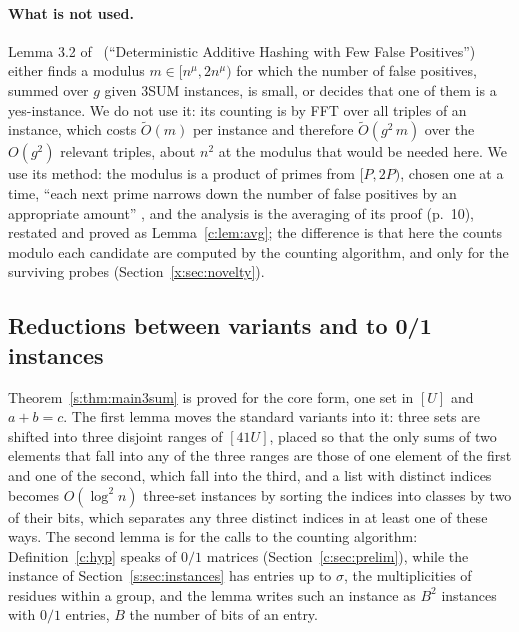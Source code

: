 \documentclass[11pt]{article}
\theoremstyle{definition}
\theoremstyle{remark}
\begin{document}
\paragraph{What is not used.} Lemma 3.2 of~\cite{FKP24} (``Deterministic Additive Hashing with Few False Positives'') either finds a modulus $m\in[n^\mu,2n^\mu)$ for which the number of false positives, summed over $g$ given 3SUM instances, is small, or decides that one of them is a yes-instance. We do not use it: its counting is by FFT over all triples of an instance, which costs $\tilde O(m)$ per instance and therefore $\tilde O(g^2\,m)$ over the $O(g^2)$ relevant triples, about $n^2$ at the modulus that would be needed here. We use its method: the modulus is a product of primes from $[P,2P)$, chosen one at a time, ``each next prime narrows down the number of false positives by an appropriate amount'' \cite[p.~9]{FKP24}, and the analysis is the averaging of its proof (p.~10), restated and proved as Lemma~\ref{c:lem:avg}; the difference is that here the counts modulo each candidate are computed by the counting algorithm, and only for the surviving probes (Section~\ref{x:sec:novelty}).

\subsection{Reductions between variants and to 0/1 instances}\label{s:sec:variants}

Theorem~\ref{s:thm:main3sum} is proved for the core form, one set in $[U]$ and $a+b=c$. The first lemma moves the standard variants into it: three sets are shifted into three disjoint ranges of $[41U]$, placed so that the only sums of two elements that fall into any of the three ranges are those of one element of the first and one of the second, which fall into the third, and a list with distinct indices becomes $O(\log^2n)$ three-set instances by sorting the indices into classes by two of their bits, which separates any three distinct indices in at least one of these ways. The second lemma is for the calls to the counting algorithm: Definition~\ref{c:hyp} speaks of $0/1$ matrices (Section~\ref{c:sec:prelim}), while the instance of Section~\ref{s:sec:instances} has entries up to $\sigma$, the multiplicities of residues within a group, and the lemma writes such an instance as $B^2$ instances with $0/1$ entries, $B$ the number of bits of an entry.
\end{document}
